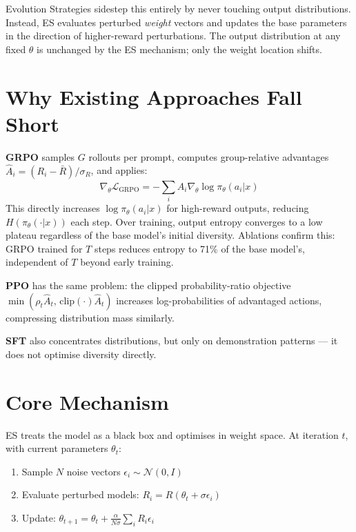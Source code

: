 \documentclass[10pt,twocolumn]{article}
\begin{document}
Evolution Strategies sidestep this entirely by never touching output
distributions. Instead, ES evaluates perturbed \emph{weight} vectors
and updates the base parameters in the direction of higher-reward
perturbations. The output distribution at any fixed $\theta$ is
unchanged by the ES mechanism; only the weight location shifts.

\section{Why Existing Approaches Fall Short}

\textbf{GRPO} samples $G$ rollouts per prompt, computes group-relative
advantages $\hat{A}_i = (R_i - \bar{R})/\sigma_R$, and applies:
\[
  \nabla_\theta \mathcal{L}_\text{GRPO} = -\sum_i \hat{A}_i
    \nabla_\theta \log \pi_\theta(a_i | x)
\]
This directly increases $\log \pi_\theta(a_i|x)$ for high-reward
outputs, reducing $H(\pi_\theta(\cdot|x))$ each step. Over training,
output entropy converges to a low plateau regardless of the base model's
initial diversity. Ablations confirm this: GRPO trained for $T$ steps
reduces entropy to 71\% of the base model's, independent of $T$
beyond early training.

\textbf{PPO} has the same problem: the clipped probability-ratio
objective $\min(\rho_t \hat{A}_t,\, \text{clip}(\cdot)\hat{A}_t)$
increases log-probabilities of advantaged actions, compressing
distribution mass similarly.

\textbf{SFT} also concentrates distributions, but only on
demonstration patterns — it does not optimise diversity directly.

\section{Core Mechanism}

ES treats the model as a black box and optimises in weight space.
At iteration $t$, with current parameters $\theta_t$:

\begin{enumerate}[itemsep=2pt,parsep=0pt]
  \item Sample $N$ noise vectors $\epsilon_i \sim \mathcal{N}(0, I)$
  \item Evaluate perturbed models: $R_i = R(\theta_t + \sigma \epsilon_i)$
  \item Update:
    $\theta_{t+1} = \theta_t + \frac{\alpha}{N\sigma}\sum_i R_i \epsilon_i$
\end{enumerate}
\end{document}

